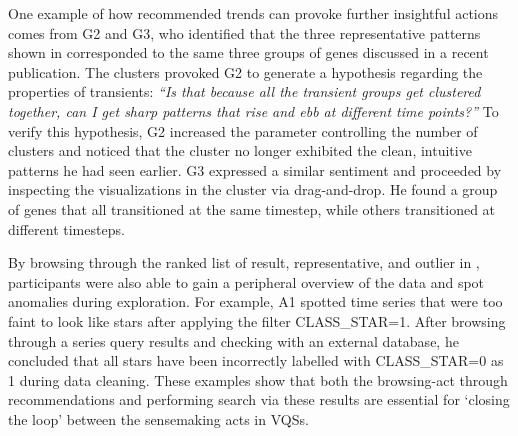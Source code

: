 One example of how recommended trends can provoke further insightful actions comes from G2 and G3, who identified that the three representative patterns shown in \zv {}corresponded to the same three groups of genes discussed in a recent publication\cite{Gloss2017}. The clusters provoked G2 to generate a hypothesis regarding the properties of transients: \textit{``Is that because all the transient groups get clustered together, can I get sharp patterns that rise and ebb at different time points?''} To verify this hypothesis, G2 increased the parameter controlling the number of clusters and noticed that the cluster no longer exhibited the clean, intuitive patterns he had seen earlier. G3 expressed a similar sentiment and proceeded by inspecting the visualizations in the cluster via drag-and-drop. He found a group of genes that all transitioned at the same timestep, while others transitioned at different timesteps. 
\par By browsing through the ranked list of result, representative, and outlier in \zv, participants were also able to gain a peripheral overview of the data and spot anomalies during exploration. For example, A1 spotted time series that were too faint to look like stars after applying the filter CLASS\_STAR=1. After browsing through a series query results and checking with an external database, he concluded that all stars have been incorrectly labelled with CLASS\_STAR=0 as 1 during data cleaning. These examples show that both the browsing-act through recommendations and performing search via these results are essential for `closing the loop' between the sensemaking acts in VQSs.
